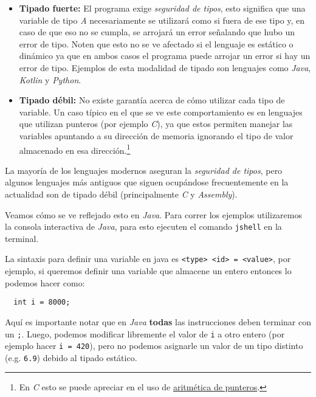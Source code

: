 \begin{itemize}
  \item \textbf{Tipado fuerte:} El programa exige \textit{seguridad de tipos}, esto significa 
    que una variable de tipo \textit{A} necesariamente se utilizará como si fuera de ese tipo
    y, en caso de que eso no se cumpla, se arrojará un error señalando que hubo un error de 
    tipo.
    Noten que esto no se ve afectado si el lenguaje es estático o dinámico ya que en ambos 
    casos el programa puede arrojar un error si hay un error de tipo.
    Ejemplos de esta modalidad de tipado son lenguajes como \textit{Java}, \textit{Kotlin} y
    \textit{Python}.
  \item \textbf{Tipado débil:} No existe garantía acerca de cómo utilizar cada tipo de 
    variable.
    Un caso típico en el que se ve este comportamiento es en lenguajes que utilizan punteros 
    (por ejemplo \textit{C}), ya que estos permiten manejar las variables apuntando a su 
    dirección de memoria ignorando el tipo de valor almacenado en esa dirección.\footnote{En 
    \textit{C} esto se puede apreciar en el uso de
    \href{https://www.tutorialspoint.com/cprogramming/c_pointer_arithmetic.htm}{aritmética de 
    punteros}.}
\end{itemize}

La mayoría de los lenguajes modernos aseguran la \textit{seguridad de tipos}, pero algunos 
lenguajes más antiguos que siguen ocupándose frecuentemente en la actualidad son de tipado 
débil (principalmente \textit{C} y \textit{Assembly}).

Veamos cómo se ve reflejado esto en \textit{Java}.
Para correr los ejemplos utilizaremos la consola interactiva de \textit{Java}, para esto ejecuten
el comando \texttt{jshell} en la terminal.

La sintaxis para definir una variable en java es \texttt{<type> <id> = <value>}, por ejemplo, si
queremos definir una variable que almacene un entero entonces lo podemos hacer como:

\begin{verbatim}
  int i = 8000;
\end{verbatim}

Aquí es importante notar que en \textit{Java} \textbf{todas} las instrucciones deben terminar con
un \texttt{;}.
Luego, podemos modificar libremente el valor de \texttt{i} a otro entero (por ejemplo hacer 
\texttt{i = 420}), pero no podemos asignarle un valor de un tipo distinto (e.g. \texttt{6.9}) 
debido al tipado estático.

